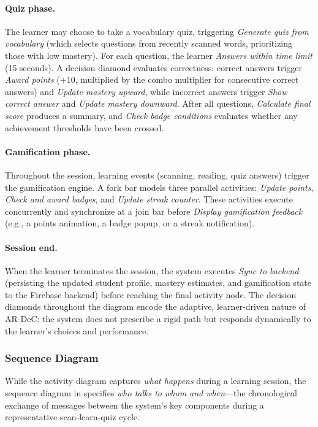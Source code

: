 \paragraph{Quiz phase.}
The learner may choose to take a vocabulary quiz, triggering \emph{Generate quiz from vocabulary} (which selects questions from recently scanned words, prioritizing those with low mastery). For each question, the learner \emph{Answers within time limit} (15 seconds). A decision diamond evaluates correctness: correct answers trigger \emph{Award points} (+10, multiplied by the combo multiplier for consecutive correct answers) and \emph{Update mastery upward}, while incorrect answers trigger \emph{Show correct answer} and \emph{Update mastery downward}. After all questions, \emph{Calculate final score} produces a summary, and \emph{Check badge conditions} evaluates whether any achievement thresholds have been crossed.

\paragraph{Gamification phase.}
Throughout the session, learning events (scanning, reading, quiz answers) trigger the gamification engine. A fork bar models three parallel activities: \emph{Update points}, \emph{Check and award badges}, and \emph{Update streak counter}. These activities execute concurrently and synchronize at a join bar before \emph{Display gamification feedback} (e.g., a points animation, a badge popup, or a streak notification).

\paragraph{Session end.}
When the learner terminates the session, the system executes \emph{Sync to backend} (persisting the updated student profile, mastery estimates, and gamification state to the Firebase backend) before reaching the final activity node. The decision diamonds throughout the diagram encode the adaptive, learner-driven nature of AR-DeC: the system does not prescribe a rigid path but responds dynamically to the learner's choices and performance.

\subsubsection{Sequence Diagram}
\label{sec:sequence}

While the activity diagram captures \emph{what happens} during a learning session, the sequence diagram in  specifies \emph{who talks to whom and when}---the chronological exchange of messages between the system's key components during a representative scan-learn-quiz cycle.

